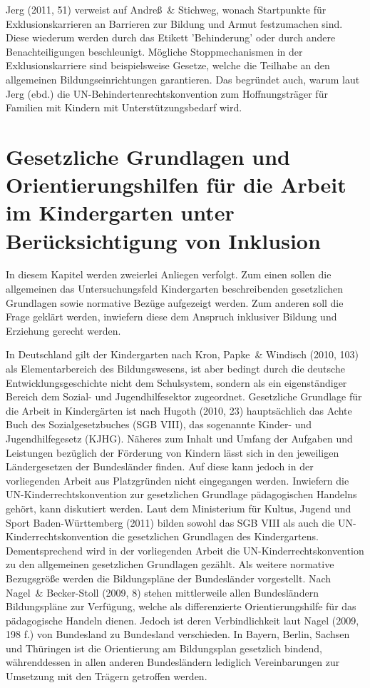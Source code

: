 Jerg (2011, 51) verweist auf Andreß~\& Stichweg, wonach Startpunkte für Exklusionskarrieren an Barrieren zur Bildung und Armut festzumachen sind. Diese wiederum werden durch das Etikett 'Behinderung' oder durch andere Benachteiligungen beschleunigt. Mögliche Stoppmechanismen in der Exklusionskarriere sind beispielsweise Gesetze, welche die Teilhabe an den allgemeinen Bildungseinrichtungen garantieren. Das begründet auch, warum laut Jerg (ebd.) die UN-Behindertenrechtskonvention zum Hoffnungsträger für Familien mit Kindern mit Unterstützungsbedarf wird. 

\section{Gesetzliche Grundlagen und Orientierungshilfen für die Arbeit im Kindergarten unter Berücksichtigung von Inklusion}

In diesem Kapitel werden zweierlei Anliegen verfolgt. Zum einen sollen die allgemeinen das Untersuchungsfeld Kindergarten beschreibenden gesetzlichen Grundlagen sowie normative Bezüge aufgezeigt werden. Zum anderen soll die Frage geklärt werden, inwiefern diese dem Anspruch inklusiver Bildung und Erziehung gerecht werden. 

In Deutschland gilt der Kindergarten nach Kron, Papke~\& Windisch (2010, 103) als Elementarbereich des Bildungswesens, ist aber bedingt durch die deutsche Entwicklungsgeschichte nicht dem Schulsystem, sondern als ein eigenständiger Bereich dem Sozial- und Jugendhilfesektor zugeordnet. 
Gesetzliche Grundlage für die Arbeit in Kindergärten ist nach Hugoth (2010, 23) hauptsächlich das Achte Buch des Sozialgesetzbuches (SGB VIII), das sogenannte Kinder- und Jugendhilfegesetz (KJHG). Näheres zum Inhalt und Umfang der Aufgaben und Leistungen bezüglich der Förderung von Kindern lässt sich in den jeweiligen Ländergesetzen der Bundesländer finden. Auf diese kann jedoch in der vorliegenden Arbeit aus Platzgründen nicht eingegangen werden. Inwiefern die UN-Kinderrechtskonvention zur gesetzlichen Grundlage pädagogischen Handelns gehört, kann diskutiert werden. Laut dem Ministerium für Kultus, Jugend und Sport Baden-Württemberg (2011) bilden sowohl das SGB VIII als auch die UN-Kinderrechtskonvention die gesetzlichen Grundlagen des Kindergartens. Dementsprechend wird in der vorliegenden Arbeit die UN-Kinderrechtskonvention zu den allgemeinen gesetzlichen Grundlagen gezählt. 
Als weitere normative Bezugsgröße werden die Bildungspläne der Bundesländer vorgestellt. Nach Nagel~\& Becker-Stoll (2009, 8) stehen  mittlerweile allen Bundesländern Bildungspläne zur Verfügung, welche als differenzierte Orientierungshilfe für das pädagogische Handeln dienen. Jedoch ist deren Verbindlichkeit laut Nagel (2009, 198 f.) von Bundesland zu Bundesland verschieden. In Bayern, Berlin, Sachsen und Thüringen ist die Orientierung am Bildungsplan gesetzlich bindend, währenddessen in allen anderen Bundesländern lediglich Vereinbarungen zur Umsetzung mit den Trägern getroffen werden.
 
